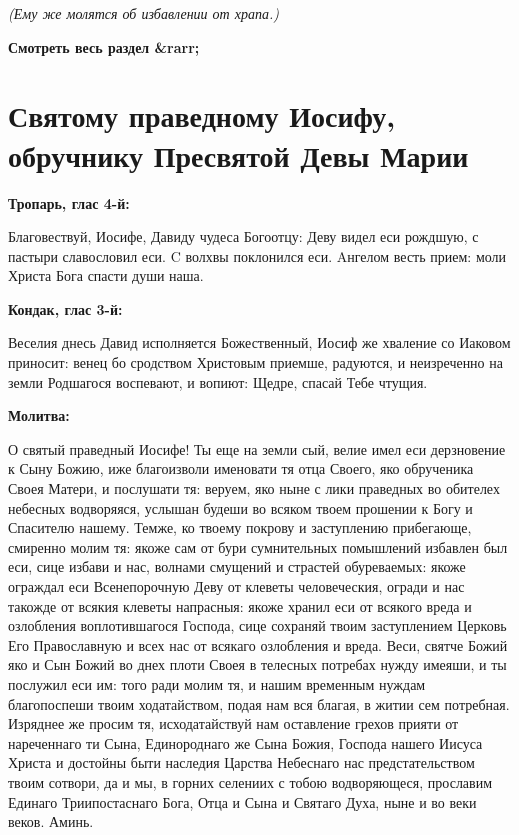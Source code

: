 \itshape (Ему же молятся об избавлении от храпа.)\normalfont{}


\mychapterending


\bfseries Смотреть весь раздел &rarr;\normalfont{} 

\section{Святому праведному Иосифу, обручнику Пресвятой Девы Марии}
 


\bfseries Тропарь, глас 4-й: \normalfont{}

Благовествуй, Иосифе, Давиду чудеса Богоотцу: Деву видел еси рождшую, с пастыри славословил еси. C волхвы поклонился еси. Aнгелом весть прием: моли Христа Бога спасти души наша. 


\bfseries Кондак, глас 3-й: \normalfont{}

Веселия днесь Давид исполняется Божественный, Иосиф же хваление со Иаковом приносит: венец бо сродством Христовым приемше, радуются, и неизреченно на земли Родшагося воспевают, и вопиют: Щедре, спасай Тебе чтущия.


\bfseries Молитва:\normalfont{}

 О святый праведный Иосифе! Ты еще на земли сый, велие имел еси дерзновение к Сыну Божию, иже благоизволи именовати тя отца Своего, яко обрученика Своея Матери, и послушати тя: веруем, яко ныне с лики праведных во обителех небесных водворяяся, услышан будеши во всяком твоем прошении к Богу и Спасителю нашему. Темже, ко твоему покрову и заступлению прибегающе, смиренно молим тя: якоже сам от бури сумнительных помышлений избавлен был еси, сице избави и нас, волнами смущений и страстей обуреваемых: якоже ограждал еси Всенепорочную Деву от клеветы человеческия, огради и нас такожде от всякия клеветы напрасныя: якоже хранил еси от всякого вреда и озлобления воплотившагося Господа, сице сохраняй твоим заступлением Церковь Его Православную и всех нас от всякаго озлобления и вреда. Веси, святче Божий яко и Сын Божий во днех плоти Своея в телесных потребах нужду имеяши, и ты послужил еси им: того ради молим тя, и нашим временным нуждам благопоспеши твоим ходатайством, подая нам вся благая, в житии сем потребная. Изряднее же просим тя, исходатайствуй нам оставление грехов прияти от нареченнаго ти Сына, Единороднаго же Сына Божия, Господа нашего Иисуса Христа и достойны быти наследия Царства Небеснаго нас предстательством твоим сотвори, да и мы, в горних селениих с тобою водворяющеся, прославим Единаго Триипостаснаго Бога, Отца и Сына и Святаго Духа, ныне и во веки веков. Аминь.


